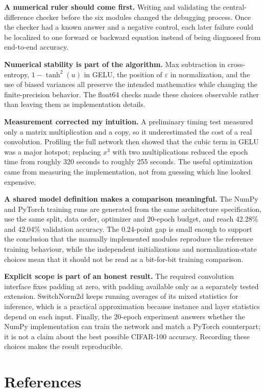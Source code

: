 \documentclass[10pt]{article}
\begin{document}
\textbf{A numerical ruler should come first.} Writing and validating the central-difference checker
before the six modules changed the debugging process. Once the checker had a known answer and a
negative control, each later failure could be localized to one forward or backward equation instead
of being diagnosed from end-to-end accuracy.

\textbf{Numerical stability is part of the algorithm.} Max subtraction in cross-entropy,
$1-\tanh^2(u)$ in GELU, the position of $\varepsilon$ in normalization, and the use of biased
variances all preserve the intended mathematics while changing the finite-precision behavior. The
float64 checks made these choices observable rather than leaving them as implementation details.

\textbf{Measurement corrected my intuition.} A preliminary timing test measured only a matrix
multiplication and a copy, so it underestimated the cost of a real convolution. Profiling the full
network then showed that the cubic term in GELU was a major hotspot; replacing $x^3$ with two
multiplications reduced the epoch time from roughly 320 seconds to roughly 255 seconds. The useful
optimization came from measuring the implementation, not from guessing which line looked expensive.

\textbf{A shared model definition makes a comparison meaningful.} The NumPy and PyTorch training
runs are generated from the same architecture specification, use the same split, data order,
optimizer and 20-epoch budget, and reach 42.28\% and 42.04\% validation accuracy. The 0.24-point gap
is small enough to support the conclusion that the manually implemented modules reproduce the
reference training behaviour, while the independent initializations and normalization-state choices
mean that it should not be read as a bit-for-bit training comparison.

\textbf{Explicit scope is part of an honest result.} The required convolution interface fixes padding
at zero, with padding available only as a separately tested extension. SwitchNorm2d keeps
running averages of its mixed statistics for inference, which is a practical approximation because
instance and layer statistics depend on each input. Finally, the 20-epoch experiment answers whether
the NumPy implementation can train the network and match a PyTorch counterpart; it is not a claim
about the best possible CIFAR-100 accuracy. Recording these choices makes the result reproducible.

\section*{References}
\end{document}
